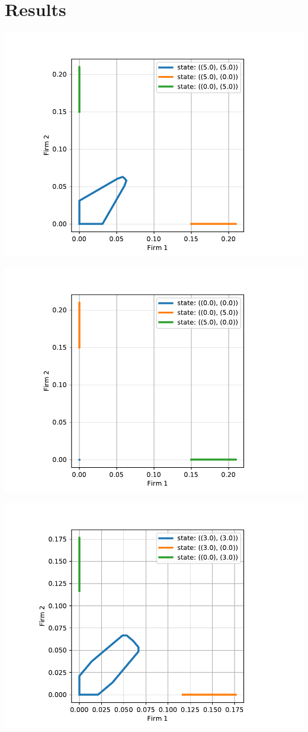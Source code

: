 \documentclass[11pt]{article}
\begin{document}
\section{Results}
\label{sec-3}
\includegraphics[width=.9\linewidth]{./img/overlap_35_30_5.pdf}

\includegraphics[width=.9\linewidth]{./img/overlap_0_5_30.pdf} 

\includegraphics[width=.9\linewidth]{./img/overlap_21_18_3.pdf}
\end{document}
